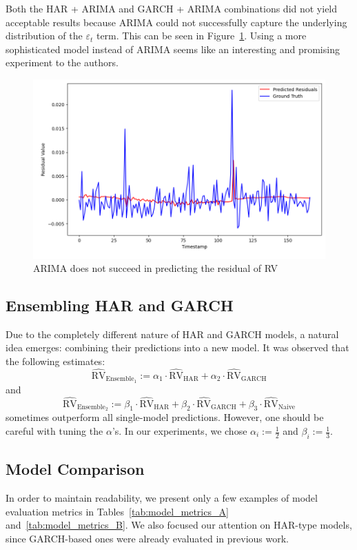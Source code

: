 Both the HAR + ARIMA and GARCH + ARIMA combinations did not yield acceptable results because ARIMA could not successfully capture the underlying distribution of the \(\varepsilon_t\) term. This can be seen in Figure~\ref{fig:arima_fails}. Using a more sophisticated model instead of ARIMA seems like an interesting and promising experiment to the authors.

\begin{figure}
    \centering
    \includegraphics[width=0.9\linewidth]{img/arima_fails.png}
    \caption{ARIMA does not succeed in predicting the residual of RV}
    \label{fig:arima_fails}
\end{figure}

\subsection{Ensembling HAR and GARCH}
Due to the completely different nature of HAR and GARCH models, a natural idea emerges: combining their predictions into a new model. It was observed that the following estimates:
$$
\widehat{\text{RV}}_{\text{Ensemble}_1} := \alpha_1 \cdot \widehat{\text{RV}}_{\text{HAR}} + \alpha_2 \cdot \widehat{\text{RV}}_{\text{GARCH}}
$$
and 
$$
\widehat{\text{RV}}_{\text{Ensemble}_2} :=  \beta_1 \cdot \widehat{\text{RV}}_{\text{HAR}} + \beta_2 \cdot \widehat{\text{RV}}_{\text{GARCH}} + \beta_3 \cdot \widehat{\text{RV}}_{\text{Naive}}
$$
sometimes outperform all single-model predictions. However, one should be careful with tuning the \(\alpha\)'s. In our experiments, we chose \(\alpha_i := \frac{1}{2}\) and \(\beta_i := \frac{1}{3}\).

\subsection{Model Comparison}
In order to maintain readability, we present only a few examples of model evaluation metrics in Tables~\ref{tab:model_metrics_A} and~\ref{tab:model_metrics_B}. We also focused our attention on HAR-type models, since GARCH-based ones were already evaluated in previous work.


